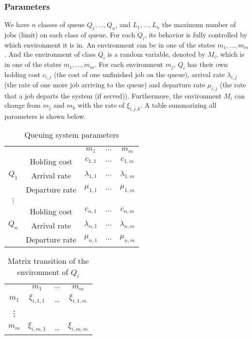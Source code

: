 \documentclass[
  a4paper, xcolor = usenames,dvipsnames]{article}
\begin{document}
\hypertarget{parameters}{%
\subsubsection{Parameters}\label{parameters}}

We have \(n\) classes of queue \(Q_{1}, \dots, Q_{n}\), and \(L_{1}, \dots, L_{n}\) the maximum number of jobs (limit) on each class of queue. For each \(Q_{i}\), its behavior is fully controlled by which environment it is in. An environment can be in one of the states \(m_{1}, \dots, m_{m}\). And the environment of class \(Q_{i}\) is a random variable, denoted by \(M_{i}\), which is in one of the states \(m_{1}, \dots, m_{m}\). For each environment \(m_{j}\), \(Q_{i}\) has their own holding cost \(c_{i, j}\) (the cost of one unfinished job on the queue), arrival rate \(\lambda_{i, j}\) (the rate of one more job arriving to the queue) and departure rate \(\mu_{i, j}\) (the rate that a job departs the system (if served)). Furthermore, the environment \(M_{i}\) can change from \(m_{j}\) and \(m_{k}\) with the rate of \(\xi_{i, j, k}\). A table summarizing all parameters is shown below.

\begin{table}[ht]
\caption{Queuing system parameters}
\begin{center}
\begin{tabular}{c c c c c}
    \hline
    \multicolumn{2}{c}{} & $m_{1}$ & $\dots$ & $m_{m}$ \\
    \cline{2-5}
    \multirow{3}{*}{$Q_{1}$} &  Holding cost & $c_{1, 1}$ & $\dots$ & $c_{1, m}$ \\
    & Arrival rate & $\lambda_{1, 1}$ & $\dots$ & $\lambda_{1, m}$ \\
    & Departure rate & $\mu_{1, 1}$ & $\dots$ & $\mu_{1, m}$ \\
    \cline{2-5}
    $\vdots$  \\
    \cline{2-5}
    \multirow{3}{*}{$Q_{n}$} &  Holding cost & $c_{n, 1}$ & $\dots$ & $c_{n, m}$ \\
    & Arrival rate & $\lambda_{n, 1}$ & $\dots$ & $\lambda_{n, m}$ \\
    & Departure rate & $\mu_{n, 1}$ & $\dots$ & $\mu_{n, m}$ \\
    \hline
\end{tabular}
\end{center}
\label{tab:qs-param}
\end{table}

\begin{table}[ht]
\caption{Matrix transition of the environment of $Q_{i}$}
\begin{center}
\begin{tabular}{c c c c}
    \hline
    & $m_{1}$ & $\dots$ & $m_{m}$ \\
    $m_{1}$ & $\xi_{i, 1, 1}$ & \dots & $\xi_{i, 1, m}$ \\
    \vdots \\
    $m_{m}$ & $\xi_{i, m, 1}$ & \dots & $\xi_{i, m, m}$ \\
    \hline
\end{tabular}
\end{center}
\label{tab:mat-transition-ci}
\end{table}
\end{document}
